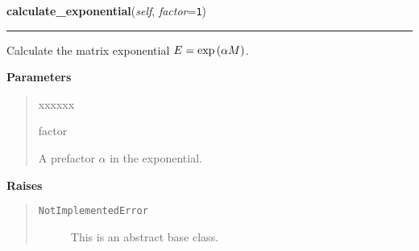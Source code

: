     \label{MatrixPotential:MatrixPotential:calculate_exponential}

    \vspace{0.5ex}

\hspace{.8\funcindent}\begin{boxedminipage}{\funcwidth}

    \raggedright \textbf{calculate\_exponential}(\textit{self}, \textit{factor}={\tt 1})

    \vspace{-1.5ex}

    \rule{\textwidth}{0.5\fboxrule}
\setlength{\parskip}{2ex}
    Calculate the matrix exponential $E =
    \exp\left( \alpha M \right)$.

\setlength{\parskip}{1ex}
      \textbf{Parameters}
      \vspace{-1ex}

      \begin{quote}
        \begin{Ventry}{xxxxxx}

          \item[factor]

          A prefactor $\alpha$ in the exponential.

        \end{Ventry}

      \end{quote}

      \textbf{Raises}
    \vspace{-1ex}

      \begin{quote}
        \begin{description}

          \item[\texttt{NotImplementedError}]

          This is an abstract base class.

        \end{description}

      \end{quote}

    \end{boxedminipage}

    \label{MatrixPotential:MatrixPotential:evaluate_exponential_at}

